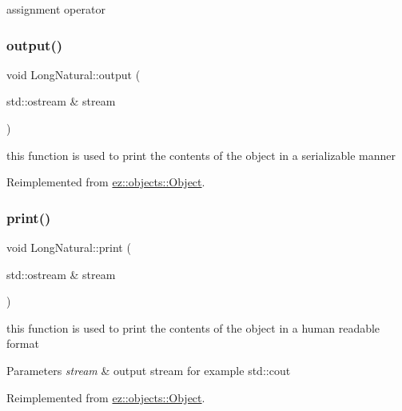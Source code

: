 assignment operator \mbox{\label{classez_1_1objects_1_1LongNatural_aae2570f931064a354df5553fd4425b90}} 
\subsubsection{\texorpdfstring{output()}{output()}}
{\footnotesize\ttfamily void Long\+Natural\+::output (\begin{DoxyParamCaption}\item[{std\+::ostream \&}]{stream }\end{DoxyParamCaption})\hspace{0.3cm}{\ttfamily [virtual]}}

this function is used to print the contents of the object in a serializable manner 

Reimplemented from \hyperlink{classez_1_1objects_1_1Object_a0fdfe18e6c35d6b0d7e7a01265aded15}{ez\+::objects\+::\+Object}.

\mbox{\label{classez_1_1objects_1_1LongNatural_a38b758c27edf31447f3bc65228900266}} 
\subsubsection{\texorpdfstring{print()}{print()}}
{\footnotesize\ttfamily void Long\+Natural\+::print (\begin{DoxyParamCaption}\item[{std\+::ostream \&}]{stream }\end{DoxyParamCaption})\hspace{0.3cm}{\ttfamily [virtual]}}

this function is used to print the contents of the object in a human readable format 
\begin{DoxyParams}{Parameters}
{\em stream} & output stream for example std\+::cout \\
\hline
\end{DoxyParams}


Reimplemented from \hyperlink{classez_1_1objects_1_1Object_a9e20f39a78163f67f000576149d858b3}{ez\+::objects\+::\+Object}.

